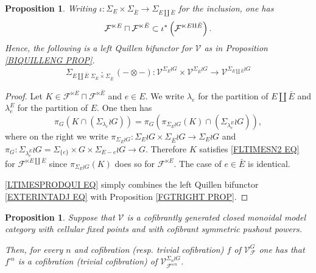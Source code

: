 \documentclass[a4paper,10pt
,draft
]{article}%
\numberwithin{equation}{section}
\numberwithin{figure}{section}
\newtheorem{proposition}[equation]{Proposition}%
\theoremstyle{definition} %
\newcommand{\1}{\ensuremath{\mathbbm 1}}%
\begin{document}
\begin{proposition}\label{LTIMESPRODINC PROP}
	Writing 
	$\iota \colon \Sigma_E \times \Sigma_{\bar{E}} \to
	\Sigma_{E \amalg \bar{E}}$ for the inclusion, one has 
\[
	\mathcal{F}^{\ltimes E}
		\sqcap
	\mathcal{F}^{\ltimes \bar{E}}
		\subset
	\iota^{\**}\left(\mathcal{F}^{\ltimes E \amalg \bar{E}}\right).
\]
	Hence, the following is a left Quillen bifunctor for $\mathcal V$ as in Proposition \ref{BIQUILLENG PROP}.
\begin{equation}\label{LTIMESPRODQUI EQ}
	\Sigma_{E \amalg \bar{E}} 
	\underset{\Sigma_E \times \Sigma_{\bar{E}}}{\cdot}
	(\minus \otimes \minus)
		\colon
	\mathcal{V}^{\Sigma_E \wr G}
		\times
	\mathcal{V}^{\Sigma_{\bar{E}} \wr G}
		\to
	\mathcal{V}^{\Sigma_{E \amalg \bar{E}} \wr G}
\end{equation}
\end{proposition}


\begin{proof}
	Let 
	$K \in 
	\mathcal{F}^{\ltimes E}
		\sqcap
	\mathcal{F}^{\ltimes \bar{E}}	
	$
	and $e \in E$. 
	We write $\lambda_e$ for the partition of $E \amalg \bar{E}$
	and $\lambda_e^E$ for the partition of $E$.
	One then has
\[
\pi_G
\left(
	K \cap \left( \Sigma_{\lambda_e} \wr G \right) \right)
	=
\pi_G
\left(
	\pi_{\Sigma_E \wr G}(K)
	\cap \left( \Sigma_{\lambda_e^E} \wr G \right)
\right),
\]
where on the right we write
$\pi_{\Sigma_E \wr G} \colon
\Sigma_E \wr G \times \Sigma_{\bar{E}} \wr G
\to 
\Sigma_E \wr G$
and 
$\pi_G \colon \Sigma_{\lambda^E_e} \wr G
=\Sigma_{\{e\}} \times G \times \Sigma_{E-e} \wr G
\to G$. Therefore $K$ 
satisfies \eqref{FLTIMESN2 EQ} for 
$\mathcal{F}^{\ltimes E \amalg \bar{E}}$
since 
$\pi_{\Sigma_E \wr G}(K)$ does so for 
$\mathcal{F}^{\ltimes E}$.
The case of $e \in \bar{E}$ is identical.

\eqref{LTIMESPRODQUI EQ} simply combines 
the left Quillen bifunctor
\eqref{EXTERINTADJ EQ} with 
Proposition \ref{FGTRIGHT PROP}.
\end{proof}


\begin{proposition}\label{POWERF PROP}
	Suppose that $\mathcal{V}$ is a cofibrantly generated closed monoidal model category with cellular fixed points and with cofibrant symmetric pushout powers.
	
	Then, for every $n$ and cofibration (resp. trivial cofibration) $f$ of $\mathcal{V}^{G}_{\mathcal{F}}$
	one has that $f^{\square n}$ is a cofibration (trivial cofibration) of $\mathcal{V}^{\Sigma_n \wr G}_{\mathcal{F}^{\ltimes n}}$.
\end{proposition}
\end{document}

